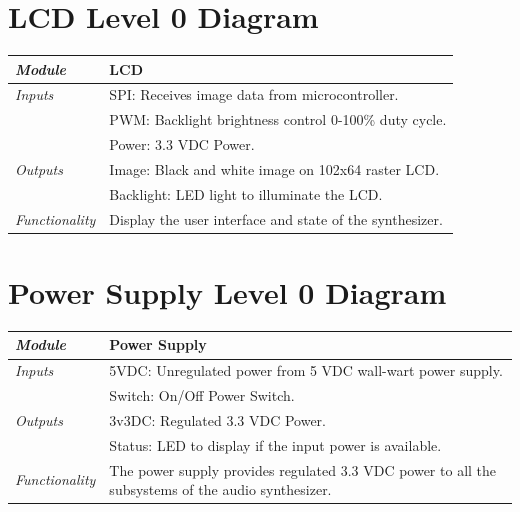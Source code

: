 \documentclass{article}
\begin{document}
\newpage

\section{LCD Level 0 Diagram}

\begin{tabular}{|p{1in}|p{5in}|}
\hline
\emph{Module} & LCD \\
\hline
\emph{Inputs}& SPI: Receives image data from microcontroller.\\
	     & PWM: Backlight brightness control 0-100\% duty cycle.\\
	     & Power: 3.3 VDC Power.\\
\hline
\emph{Outputs}& Image: Black and white image on 102x64 raster LCD.\\
	      & Backlight: LED light to illuminate the LCD.\\ 
\hline
\emph{Functionality}& Display the user interface and state of the synthesizer.\\
\hline
\end{tabular}

\section{Power Supply Level 0 Diagram}

\begin{tabular}{|p{1in}|p{5in}|}
\hline
\emph{Module} & Power Supply \\
\hline
\emph{Inputs}& 5VDC: Unregulated power from 5 VDC wall-wart power supply.\\
	     & Switch: On/Off Power Switch.\\
\hline
\emph{Outputs}& 3v3DC: Regulated 3.3 VDC Power.\\
	      & Status: LED to display if the input power is available.\\ 
\hline
\emph{Functionality}& The power supply provides regulated 3.3 VDC power to all the subsystems of the audio synthesizer.\\
\hline
\end{tabular}
\end{document}
